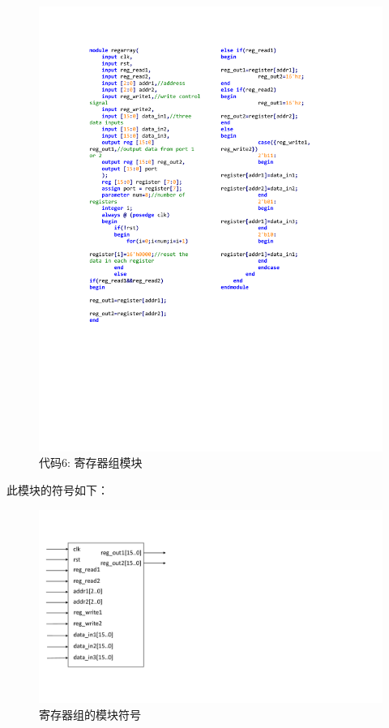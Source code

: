 \documentclass[titlepage, 11pt]{article}
\begin{document}
		\begin{figure}[H]
			\centering
			\includegraphics[scale=0.961]{24.pdf}
			\caption*{代码6: 寄存器组模块}
		\end{figure}
		此模块的符号如下：
		\begin{figure}[H]
			\centering
			\includegraphics[scale=0.5]{25.pdf}
			\caption{寄存器组的模块符号}
		\end{figure}
\end{document}
